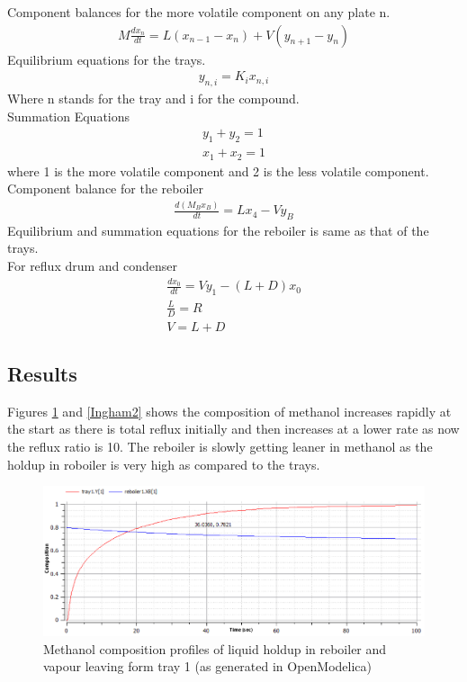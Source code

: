 \documentclass[12pt]{report}
\begin{document}
Component balances for the more volatile component on any plate n.
\begin{gather*}
M\frac{dx_n}{dt} = L(x_{n-1} - x_n) + V(y_{n+1} - y_n)
\end{gather*}
Equilibrium equations for the trays.
\begin{gather*}
y_{n,i} = K_ix_{n,i}
\end{gather*}
Where n stands for the tray and i for the compound.\\
Summation Equations
\begin{gather*}
y_1 + y_2 = 1 \\
x_1 + x_2 = 1
\end{gather*}
where 1 is the more volatile component and 2 is the less volatile component. \\
Component balance for the reboiler
\begin{gather*}
\frac{d(M_Bx_B)}{dt} = Lx_4 - Vy_B
\end{gather*}
Equilibrium and summation equations for the reboiler is same as that of the trays. \\
For reflux drum and condenser
\begin{gather*}
\frac{dx_0}{dt} = Vy_1 - (L + D)x_0 \\
\frac{L}{D} = R \\
V = L + D
\end{gather*}

\subsection{Results}
Figures \ref{Ingham4} and \ref{Ingham2}\cite{ingham} shows the composition of methanol increases rapidly at the start as there is total reflux initially and then increases at a lower rate as now the reflux ratio is 10. The reboiler is slowly getting leaner in methanol as the holdup in roboiler is very high as compared to the trays. 

\begin{figure}
\centering
\includegraphics[width=1\linewidth]{Ingham4}
\caption{Methanol composition profiles of liquid holdup in reboiler and vapour leaving form tray 1 (as generated in OpenModelica)}
\label{Ingham4}
\end{figure}
\end{document}
